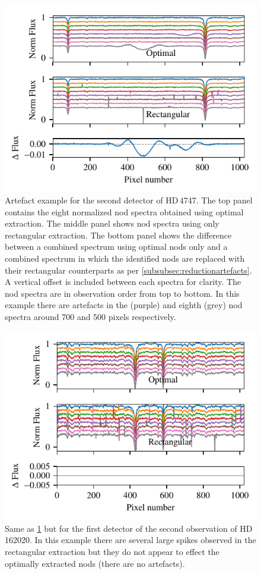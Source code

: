  \begin{figure}
     \centering
     \includegraphics[width=0.7\linewidth]{figures/appendix/bp_plots/extraction_comparision_HD4747-1_chip_2}
     \caption{Artefact example for the second detector of {HD\,4747}.  The top panel contains the eight normalized nod spectra obtained using optimal extraction.
The middle panel shows nod spectra using only rectangular extraction.
The bottom panel shows the difference between a combined spectrum using optimal nods only and a combined spectrum in which the identified nods are replaced with their rectangular counterparts as per \cref{subsubsec:reductionartefacts}.
A vertical offset is included between each spectra for clarity.
The nod spectra are in observation order from top to bottom.
In this example there are artefacts in the  (purple) and eighth (grey) nod spectra around 700 and 500 pixels respectively.}
     \label{fig:artefact_example1}
 \end{figure}
 \begin{figure}
     \centering
     \includegraphics[width=0.7\linewidth]{figures/appendix/bp_plots/rescaled_extraction_comparision_HD162020-2_chip_1}
     \caption{Same as \cref{fig:artefact_example1} but for the first detector of the second observation of {HD\,162020}.
In this example there are several large spikes observed in the rectangular extraction but they do not appear to effect the optimally extracted nods (there are no artefacts).}
     \label{fig:artefact_example2}
 \end{figure}
